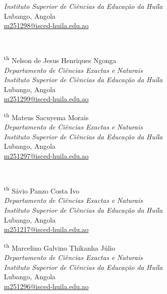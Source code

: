 \documentclass[conference]{IEEEtran}
\begin{document}
{\begin{minipage}[t]{0.48\textwidth}
\textit{Instituto Superior de Ciências da Educação da Huíla}\\
Lubango, Angola\\
\href{mailto:m251298@isced-huila.edu.ao}{m251298@isced-huila.edu.ao}
\end{minipage}\\[1.4em]
\begin{minipage}[t]{0.48\textwidth}\textsuperscript{th} Nelson de Jesus Henriques Ngonga\\
\textit{Departamento de Ciências Exactas e Naturais}\\
\textit{Instituto Superior de Ciências da Educação da Huíla}\\
Lubango, Angola\\
\href{mailto:m251299@isced-huila.edu.ao}{m251299@isced-huila.edu.ao}
\end{minipage}%
\hfill
\begin{minipage}[t]{0.48\textwidth}\textsuperscript{th} Mateus Sacuyema Morais\\
\textit{Departamento de Ciências Exactas e Naturais}\\
\textit{Instituto Superior de Ciências da Educação da Huíla}\\
Lubango, Angola\\
\href{mailto:m251297@isced-huila.edu.ao}{m251297@isced-huila.edu.ao}
\end{minipage}\\[1.4em]
\begin{minipage}[t]{0.48\textwidth}\textsuperscript{th} Sávio Panzo Costa Ivo\\
\textit{Departamento de Ciências Exactas e Naturais}\\
\textit{Instituto Superior de Ciências da Educação da Huíla}\\
Lubango, Angola\\
\href{mailto:m251217@isced-huila.edu.ao}{m251217@isced-huila.edu.ao}
\end{minipage}%
\hfill
\begin{minipage}[t]{0.48\textwidth}\textsuperscript{th} Marcelino Galvino Thikanha Júlio\\
\textit{Departamento de Ciências Exactas e Naturais}\\
\textit{Instituto Superior de Ciências da Educação da Huíla}\\
Lubango, Angola\\
\href{mailto:m251296@isced-huila.edu.ao}{m251296@isced-huila.edu.ao}
\end{minipage}
}
\end{document}
